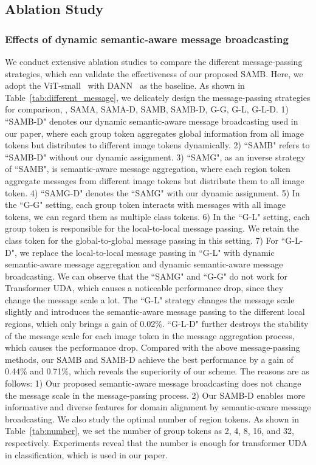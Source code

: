 \documentclass[journal]{IEEEtran}
\begin{document}
\subsection{Ablation Study}
\label{sec:ab}
\subsubsection{Effects of dynamic semantic-aware message broadcasting}
\label{sec:ab_ms}
We conduct extensive ablation studies to compare the different message-passing strategies, which can validate the effectiveness of our proposed SAMB. Here, we adopt the ViT-small~\cite{dosovitskiy2020imageViT} with DANN~\cite{ganin2016domain_dann} as the baseline. As shown in Table~\ref{tab:different_message}, we
delicately design the  message-passing strategies for comparison, \ieno, SAMA, SAMA-D, SAMB, SAMB-D, G-G, G-L, G-L-D. 1) ``SAMB-D" denotes our dynamic semantic-aware message broadcasting used in our paper, where each group token aggregates global information from all image tokens but distributes to different image tokens dynamically. 2) ``SAMB" refers to ``SAMB-D" without our dynamic assignment. 3) ``SAMG", as an inverse strategy of ``SAMB", is semantic-aware message aggregation, where each region token aggregate messages from different image tokens but distribute them to all image token. 4) ``SAMG-D" denotes the ``SAMG" with our dynamic assignment. 
5) In the ``G-G" setting, each group token interacts with messages with all image tokens, we can regard them as multiple class tokens. 6) In the ``G-L" setting, each group token is responsible for the local-to-local message passing. We retain the class token for the global-to-global message passing in this setting. 7) For ``G-L-D", we replace the local-to-local message passing in ``G-L" with dynamic semantic-aware message aggregation and dynamic semantic-aware message broadcasting. 
We can observe that the ``SAMG" and  ``G-G" do not work for Transformer UDA, which causes a noticeable performance drop, since they change the message scale a lot. The ``G-L" strategy changes the message scale slightly and introduces the semantic-aware message passing to the different local regions, which only brings a gain of 0.02\%. ``G-L-D" further destroys the stability of the message scale for each image token in the message aggregation process, which causes the performance drop. Compared with the above message-passing methods, our SAMB and SAMB-D achieve the best performance by a gain of 0.44\% and 0.71\%, which reveals the superiority of our scheme. The reasons are as follows: 1) Our proposed semantic-aware message broadcasting does not change the message scale in the message-passing process. 2) Our SAMB-D enables more informative and diverse features for domain alignment by semantic-aware message broadcasting.  
We also study the optimal number of region tokens. As shown in Table~\ref{tab:number}, we set the number of group tokens as 2, 4, 8, 16, and 32, respectively. Experiments reveal that the number  is enough for transformer UDA in classification, which is used in our paper. 
\end{document}
